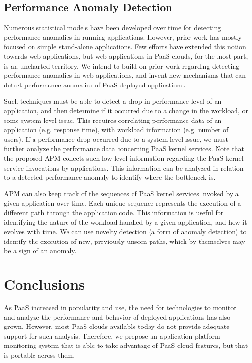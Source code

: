 \documentclass[11pt]{article}
\begin{document}
\subsection{Performance Anomaly Detection}
Numerous statistical models have been developed over time for detecting performance anomalies in running
applications. However, prior work has mostly focused on simple stand-alone applications. Few efforts have
extended this notion towards web applications, but web applications in PaaS clouds, for the most part,
is an uncharted territory. We intend to build on prior work regarding detecting performance anomalies in
web applications, and invent new mechanisms that can detect performance anomalies of PaaS-deployed
applications.

Such techniques must be able to detect a drop in performance level of an application, and then
determine if it occurred due to a change in the workload, or some system-level issue. This requires
correlating performance data of an application (e.g. response time), with workload information (e.g. number
of users). If a performance drop
occurred due to a system-level issue, we must further analyze the performance data concerning
PaaS kernel services. Note that the proposed APM collects such low-level information regarding
the PaaS kernel service invocations by applications. This information can be analyzed in relation 
to a detected performance anomaly to identify where the bottleneck is.

APM can also keep track of the sequences of PaaS kernel services invoked by a given application over time.
Each unique sequence represents the execution of a different path through the application code. 
This information is useful for
identifying the nature of the workload handled by a given application, and how it evolves with time. 
We can use novelty detection (a form of anomaly detection) to identify the execution of new, previously
unseen paths, which by themselves may be a sign of an anomaly.

\section{Conclusions}
As PaaS increased in popularity and use, the need 
for technologies to monitor and analyze the performance and behavior of
deployed applications has also grown. 
However, most PaaS clouds available today do not provide adequate support
for such analysis.
Therefore, we propose an application platform monitoring system that 
is able to take advantage of PaaS cloud features, but that is portable
across them.
\end{document}
